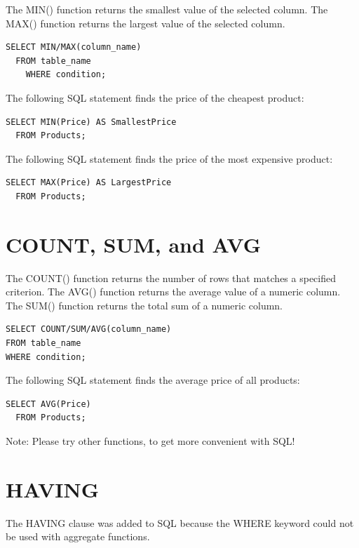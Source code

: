 \documentclass[
]{book}
\begin{document}
The MIN() function returns the smallest value of the selected column. The MAX() function returns the largest value of the selected column.

\begin{verbatim}
SELECT MIN/MAX(column_name)
  FROM table_name
    WHERE condition;
\end{verbatim}

The following SQL statement finds the price of the cheapest product:

\begin{verbatim}
SELECT MIN(Price) AS SmallestPrice
  FROM Products;
\end{verbatim}

The following SQL statement finds the price of the most expensive product:

\begin{verbatim}
SELECT MAX(Price) AS LargestPrice
  FROM Products;
\end{verbatim}

\hypertarget{count-sum-and-avg}{%
\section{COUNT, SUM, and AVG}\label{count-sum-and-avg}}

The COUNT() function returns the number of rows that matches a specified criterion. The AVG() function returns the average value of a numeric column. The SUM() function returns the total sum of a numeric column.

\begin{verbatim}
SELECT COUNT/SUM/AVG(column_name)
FROM table_name
WHERE condition;
\end{verbatim}

The following SQL statement finds the average price of all products:

\begin{verbatim}
SELECT AVG(Price)
  FROM Products;
\end{verbatim}

Note: Please try other functions, to get more convenient with SQL!

\hypertarget{having}{%
\section{HAVING}\label{having}}

The HAVING clause was added to SQL because the WHERE keyword could not be used with aggregate functions.
\end{document}
